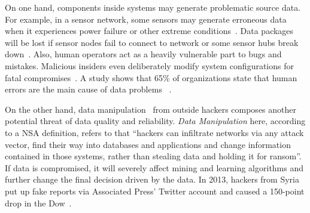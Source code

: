 \documentclass[10pt,conference,letterpaper]{article}
\begin{document}
		On one hand, components inside systems may generate problematic source data. For example, in a sensor network, some sensors may generate erroneous data when it experiences power failure or other extreme conditions~\cite{rassam2014adaptive}. Data packages will be lost if sensor nodes fail to connect to network or some sensor hubs break down~\cite{herodotou2014scalable}. Also, human operators act as a heavily vulnerable part to bugs and mistakes. Malicious insiders even deliberately modify system configurations for fatal compromises~\cite{schuster2015vc3}. A study shows that 65\% of organizations state that human errors are the main  cause of data problems~\cite{humanError} .
		
		On the other hand, data manipulation~\cite{dataManipulation} from outside hackers composes another potential threat of data quality and reliability. \textit{Data Manipulation} here, according to a NSA definition, refers to that ``hackers can infiltrate networks via any attack vector, find their way into databases and applications and change information contained in those systems, rather than stealing data and holding it for ransom''.
		If data is compromised, it will severely affect mining and learning algorithms and further change the final decision driven by the data. In 2013, hackers from Syria put up fake reports via Associated Press' Twitter account and caused a 150-point drop in the Dow~\cite{SyriaHacker}.
		
\end{document}
